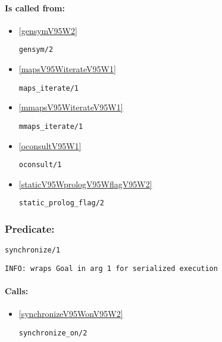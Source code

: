 \paragraph{Is called from:} 
\begin{itemize}
\item \ref{gensymV95W2} 
\begin{verbatim}
gensym/2
\end{verbatim}

\item \ref{mapsV95WiterateV95W1} 
\begin{verbatim}
maps_iterate/1
\end{verbatim}

\item \ref{mmapsV95WiterateV95W1} 
\begin{verbatim}
mmaps_iterate/1
\end{verbatim}

\item \ref{oconsultV95W1} 
\begin{verbatim}
oconsult/1
\end{verbatim}

\item \ref{staticV95WprologV95WflagV95W2} 
\begin{verbatim}
static_prolog_flag/2
\end{verbatim}

\end{itemize}

\subsubsection{Predicate:} \label{synchronizeV95W1}

\begin{verbatim}
synchronize/1
\end{verbatim}

{\small \begin{verbatim}
INFO: wraps Goal in arg 1 for serialized execution

\end{verbatim}}
\paragraph{Calls:} 
\begin{itemize}
\item \ref{synchronizeV95WonV95W2} 
\begin{verbatim}
synchronize_on/2
\end{verbatim}

\end{itemize}
